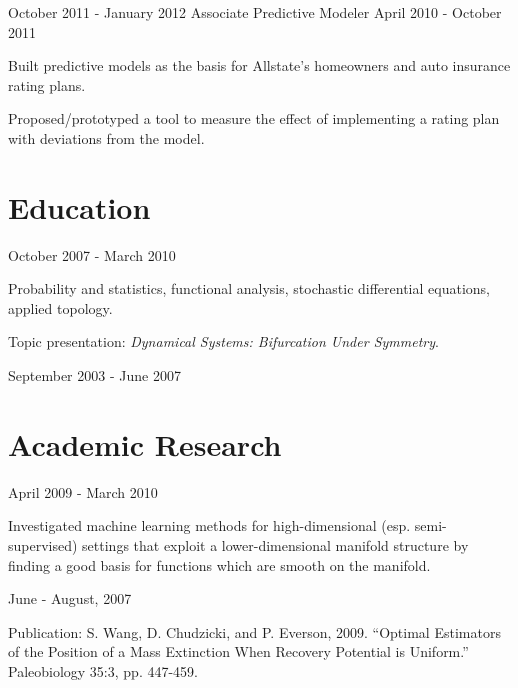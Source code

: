 \documentclass[letterpaper]{resume}
\begin{document}
{October 2011 - January 2012}
{Associate Predictive Modeler}
{April 2010 - October 2011}


\begin{compactitem}
\item Built predictive models as the basis for Allstate's homeowners and auto insurance rating plans.
\item Proposed/prototyped a tool to measure the effect of implementing a rating plan with deviations from the model.
\end{compactitem}

\section{Education}

{October 2007 - March 2010}
{}
{}
\begin{compactitem}
\item Probability and statistics, functional analysis, stochastic differential equations, applied topology.
\item Topic presentation: \textit{Dynamical Systems: Bifurcation Under Symmetry}.      
\end{compactitem}


{September 2003 - June 2007}
{}
{}

\section{Academic Research}

{April 2009 - March 2010}
{}
{}
\begin{compactitem}
\item Investigated machine learning methods for 
high-dimensional (esp. semi-supervised) settings that exploit a lower-dimensional manifold structure by finding a good 
basis for functions which are smooth on the manifold.
\end{compactitem}

{June - August, 2007}
{}
{}
\begin{compactitem}

\item Publication: S. Wang, D. Chudzicki, and P. Everson, 2009. ``Optimal Estimators of the Position of a Mass Extinction When Recovery Potential is Uniform.'' Paleobiology 35:3, pp. 447-459. 

\end{compactitem}
\end{document}
